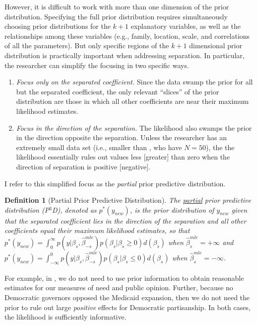 \documentclass[12pt]{article}
\newtheorem{defn}{Definition}
\begin{document}
However, it is difficult to work with more than one dimension of the prior distribution. Specifying the full prior distribution requires simultaneously choosing prior distributions for the $k + 1$ explanatory variables, as well as the relationships among these variables (e.g., family, location, scale, and correlations of all the parameters). But only specific regions of the $k + 1$ dimensional prior distribution is practically important when addressing separation. In particular, the researcher can simplify the focusing in two specific ways.
\begin{enumerate}
\item \emph{Focus only on the separated coefficient.} Since the data swamp the prior for all but the separated coefficient, the only relevant ``slices'' of the prior distribution are those in which all other coefficients are near their maximum likelihood estimates.
\item \emph{Focus in the direction of the separation.} The likelihood also swamps the prior in the direction opposite the separation. Unless the researcher has an extremely small data set (i.e., smaller than \cite{BarrilleauxRainey2014}, who have $N = 50$), the the likelihood essentially rules out values less [greater] than zero when the direction of separation is positive [negative].
\end{enumerate}

I refer to this simplified focus as the \emph{partial} prior predictive distribution.

\begin{defn}[Partial Prior Predictive Distribution]\label{def:pppd} The \underline{partial} prior predictive distribution (P$^3$D), denoted as $p^*(y_{new})$, is the prior distribution of $y_{new}$ given that the separated coefficient lies in the direction of the separation and all other coefficients equal their maximum likelihood estimates, so that $p^*(y_{new}) = \int_{0}^{\infty} p(y | \beta_s, \hat{\beta}_{-s}^{mle})p(\beta_s | \beta_s \geq 0)d(\beta_s)$ when $\hat{\beta}_{s}^{mle} = +\infty$ and $p^*(y_{new}) = \int_{-\infty}^{0} p(y | \beta_s, \hat{\beta}_{-s}^{mle})p(\beta_s | \beta_s \leq 0)d(\beta_s)$ when $\hat{\beta}_{s}^{mle} = -\infty$.
\end{defn}

For example, in \cite{BarrilleauxRainey2014}, we do not need to use prior information to obtain reasonable estimates for our measures of need and public opinion. Further, because no Democratic governors opposed the Medicaid expansion, then we do not need the prior to rule out large \textit{positive} effects for Democratic partisanship. In both cases, the likelihood is sufficiently informative. 
\end{document}
